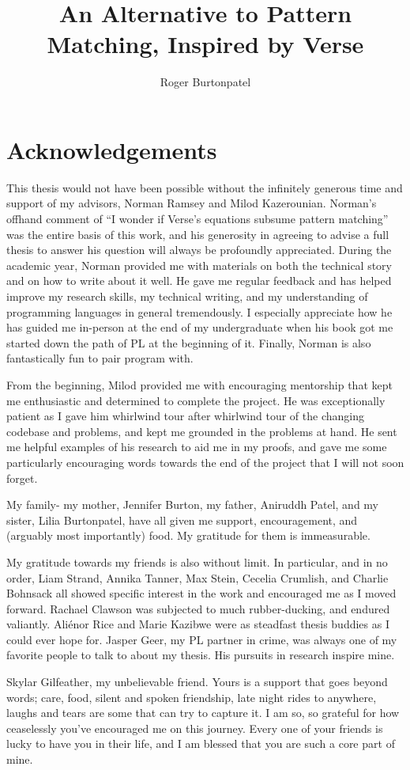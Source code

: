\documentclass[manuscript,screen,review, 12pt, nonacm]{acmart}
\title{An Alternative to Pattern Matching, Inspired by Verse}
\author{Roger Burtonpatel}
\affiliation{%
\institution{Tufts University}
\streetaddress{419 Boston Ave}
  \city{Medford}
  \state{Massachusetts}
  \country{USA}
  \postcode{02155}
  }
\begin{document}
\section{Acknowledgements}

This thesis would not have been possible without the infinitely generous time
and support of my advisors, Norman Ramsey and Milod Kazerounian. Norman's
offhand comment of “I wonder if Verse's equations subsume pattern matching” was
the entire basis of this work, and his generosity in agreeing to advise a full
thesis to answer his question will always be profoundly appreciated. During the
academic year, Norman provided me with materials on both the technical story and
on how to write about it well. He gave me regular feedback and has helped
improve my research skills, my technical writing, and my understanding of
programming languages in general tremendously. I especially appreciate how he
has guided me in-person at the end of my undergraduate when his book\cite{bpc}
got me started down the path of PL at the beginning of it. Finally, Norman is
also fantastically fun to pair program with. 

From the beginning, Milod provided me with encouraging mentorship that kept
me enthusiastic and determined to complete the project. He was exceptionally
patient as I gave him whirlwind tour after whirlwind tour of the changing
codebase and problems, and kept me grounded in the problems at hand. He 
sent me helpful examples of his research to aid me in my proofs, and gave me
some particularly encouraging words towards the end of the project that I 
will not soon forget. 

My family- my mother, Jennifer Burton, my father, Aniruddh Patel, and my
sister, Lilia Burtonpatel, have all given me support, encouragement, and
(arguably most importantly) food. My gratitude for them is immeasurable. 

My gratitude towards my friends is also without limit. In particular, and in
no order, Liam Strand, Annika Tanner, Max Stein, Cecelia Crumlish, and
Charlie Bohnsack all showed specific interest in the work and encouraged me
as I moved forward. Rachael Clawson was subjected to much rubber-ducking,
and endured valiantly. Aliénor Rice and Marie Kazibwe were as steadfast
thesis buddies as I could ever hope for. Jasper Geer, my PL partner in
crime, was always one of my favorite people to talk to about my thesis. His
pursuits in research inspire mine. 

Skylar Gilfeather, my unbelievable friend. Yours is a support that goes
beyond words; care, food, silent and spoken friendship, late night rides to
anywhere, laughs and tears are some that can try to capture it. I am so, so
grateful for how ceaselessly you've encouraged me on this journey. Every one
of your friends is lucky to have you in their life, and I am blessed that 
you are such a core part of mine. 
\end{document}
